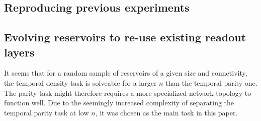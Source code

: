 \subsection{Reproducing previous experiments}

\subsection{Evolving reservoirs to re-use existing readout layers}


It seems that for a random sample of reservoirs of a given size and connetivity,
the temporal density task is solveable for a larger $ n $ than the temporal parity one.
The parity task might therefore requires a more specialized network topology to function well.
Due to the seemingly increased complexity of separating the temporal parity task at low $ n $,
it was chosen as the main task in this paper.

